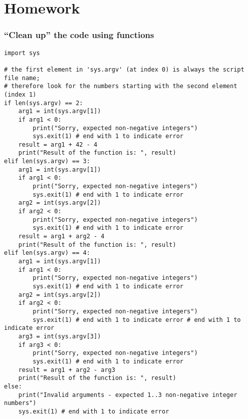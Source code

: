 \documentclass[aspectratio=169]{beamer}
\newcommand{\style}[1]{\ttfamily#1}
\begin{document}
\section{Homework}

\begin{frame}[fragile]
\frametitle{``Clean up'' the code using functions}
\begin{lstlisting}[basicstyle=\style{\fontsize{4}{4}\selectfont{}}]
import sys

# the first element in 'sys.argv' (at index 0) is always the script file name;
# therefore look for the numbers starting with the second element (index 1)
if len(sys.argv) == 2:
    arg1 = int(sys.argv[1])
    if arg1 < 0:
        print("Sorry, expected non-negative integers")
        sys.exit(1) # end with 1 to indicate error
    result = arg1 + 42 - 4
    print("Result of the function is: ", result)
elif len(sys.argv) == 3:
    arg1 = int(sys.argv[1])
    if arg1 < 0:
        print("Sorry, expected non-negative integers")
        sys.exit(1) # end with 1 to indicate error
    arg2 = int(sys.argv[2])
    if arg2 < 0:
        print("Sorry, expected non-negative integers")
        sys.exit(1) # end with 1 to indicate error
    result = arg1 + arg2 - 4
    print("Result of the function is: ", result)
elif len(sys.argv) == 4:
    arg1 = int(sys.argv[1])
    if arg1 < 0:
        print("Sorry, expected non-negative integers")
        sys.exit(1) # end with 1 to indicate error
    arg2 = int(sys.argv[2])
    if arg2 < 0:
        print("Sorry, expected non-negative integers")
        sys.exit(1) # end with 1 to indicate error # end with 1 to indicate error
    arg3 = int(sys.argv[3])
    if arg3 < 0:
        print("Sorry, expected non-negative integers")
        sys.exit(1) # end with 1 to indicate error
    result = arg1 + arg2 - arg3
    print("Result of the function is: ", result)
else:
    print("Invalid arguments - expected 1..3 non-negative integer numbers")
    sys.exit(1) # end with 1 to indicate error
\end{lstlisting}

\end{frame}
\end{document}
